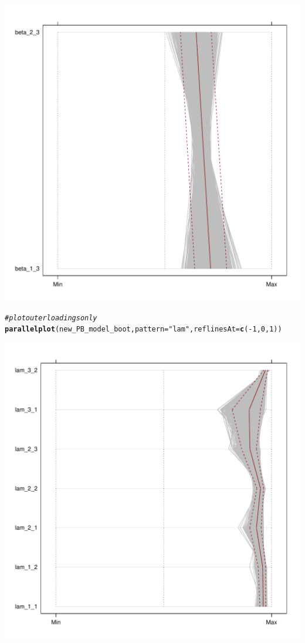 \documentclass{article}\usepackage[]{graphicx}\usepackage[]{color}
\makeatletter
\def\maxwidth{ %
  \ifdim\Gin@nat@width>\linewidth
    \linewidth
  \else
    \Gin@nat@width
  \fi
}
\newcommand{\hlnum}[1]{\textcolor[rgb]{0.686,0.059,0.569}{#1}}%
\newcommand{\hlstr}[1]{\textcolor[rgb]{0.192,0.494,0.8}{#1}}%
\newcommand{\hlcom}[1]{\textcolor[rgb]{0.678,0.584,0.686}{\textit{#1}}}%
\newcommand{\hlopt}[1]{\textcolor[rgb]{0,0,0}{#1}}%
\newcommand{\hlstd}[1]{\textcolor[rgb]{0.345,0.345,0.345}{#1}}%
\newcommand{\hlkwc}[1]{\textcolor[rgb]{0.333,0.667,0.333}{#1}}%
\newcommand{\hlkwd}[1]{\textcolor[rgb]{0.737,0.353,0.396}{\textbf{#1}}}%
\newenvironment{kframe}{%
 \def\at@end@of@kframe{}%
 \ifinner\ifhmode%
  \def\at@end@of@kframe{\end{minipage}}%
  \begin{minipage}{\columnwidth}%
 \fi\fi%
 \def\FrameCommand##1{\hskip\@totalleftmargin \hskip-\fboxsep
 \colorbox{shadecolor}{##1}\hskip-\fboxsep
     \hskip-\linewidth \hskip-\@totalleftmargin \hskip\columnwidth}%
 \MakeFramed {\advance\hsize-\width
   \@totalleftmargin\z@ \linewidth\hsize
   \@setminipage}}%
 {\par\unskip\endMakeFramed%
 \at@end@of@kframe}
\newenvironment{knitrout}{}{} %
\makeatother
\begin{document}
\begin{knitrout}
\includegraphics[width=\maxwidth]{figure/boot-2} 
\begin{kframe}\begin{alltt}
\hlcom{#plot outer loadings only}
\hlkwd{parallelplot}\hlstd{(new_PB_model_boot,} \hlkwc{pattern}\hlstd{=}\hlstr{"lam"}\hlstd{,}\hlkwc{reflinesAt}\hlstd{=}\hlkwd{c}\hlstd{(}\hlopt{-}\hlnum{1}\hlstd{,}\hlnum{0}\hlstd{,}\hlnum{1}\hlstd{))}
\end{alltt}
\end{kframe}
\includegraphics[width=\maxwidth]{figure/boot-3} 

\end{knitrout}
\end{document}
